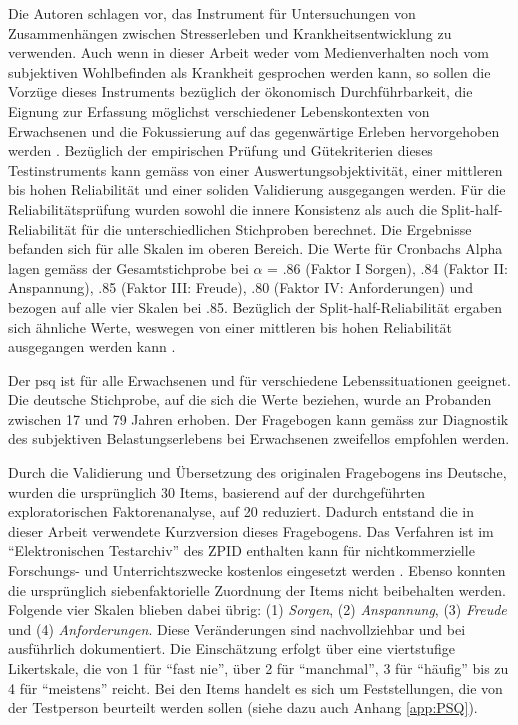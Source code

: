 Die Autoren  schlagen vor, das Instrument für Untersuchungen von Zusammenhängen zwischen Stresserleben und Krankheitsentwicklung zu verwenden. Auch wenn in dieser Arbeit weder vom Medienverhalten noch vom subjektiven Wohlbefinden als Krankheit gesprochen werden kann, so sollen die Vorzüge dieses Instruments bezüglich der ökonomisch Durchführbarkeit, die Eignung zur Erfassung möglichst verschiedener Lebenskontexten von Erwachsenen und die Fokussierung auf das gegenwärtige Erleben hervorgehoben werden \cite{Fliege2001}. Bezüglich der empirischen Prüfung und Gütekriterien dieses Testinstruments kann gemäss  von einer Auswertungsobjektivität, einer mittleren bis hohen Reliabilität und einer soliden Validierung ausgegangen werden. 
Für die Reliabilitätsprüfung wurden sowohl die innere Konsistenz als auch die Split-half-Reliabilität für die unterschiedlichen Stichproben berechnet. Die Ergebnisse befanden sich für alle Skalen im oberen Bereich. Die Werte für Cronbachs Alpha lagen gemäss \cite{Fliege2001} der Gesamtstichprobe bei $\alpha$ = .86 (Faktor I Sorgen), .84 (Faktor II: Anspannung), .85 (Faktor III: Freude), .80 (Faktor IV: Anforderungen) und bezogen auf alle vier Skalen bei .85. Bezüglich der Split-half-Reliabilität ergaben sich ähnliche Werte, weswegen von einer mittleren bis hohen Reliabilität ausgegangen werden kann \cite{Fliege2001}.

Der \acrshort{psq} \cite{Fliege2001} ist für alle Erwachsenen und für verschiedene Lebenssituationen geeignet. Die deutsche Stichprobe, auf die sich die Werte beziehen, wurde an Probanden zwischen 17 und 79 Jahren erhoben. Der Fragebogen kann gemäss  zur Diagnostik des subjektiven Belastungserlebens bei Erwachsenen zweifellos empfohlen werden.

Durch die Validierung und Übersetzung des originalen Fragebogens ins Deutsche, wurden die ursprünglich 30 Items, basierend auf der durchgeführten exploratorischen Faktorenanalyse, auf 20 reduziert. Dadurch entstand die in dieser Arbeit verwendete Kurzversion dieses Fragebogens. Das Verfahren ist im \enquote{Elektronischen Testarchiv} des ZPID enthalten kann für nichtkommerzielle Forschungs- und Unterrichtszwecke kostenlos eingesetzt werden \cite{ZPID}. Ebenso konnten die ursprünglich siebenfaktorielle Zuordnung der Items nicht beibehalten werden. Folgende vier Skalen blieben dabei übrig: (1) \textit{Sorgen}, (2) \textit{Anspannung}, (3) \textit{Freude} und (4) \textit{Anforderungen}. Diese Veränderungen sind nachvollziehbar und bei  ausführlich dokumentiert. Die Einschätzung erfolgt über eine viertstufige Likertskale, die von 1 für \enquote{fast nie}, über 2 für \enquote{manchmal}, 3 für \enquote{häufig} bis zu 4 für \enquote{meistens} reicht. Bei den Items handelt es sich um Feststellungen, die von der Testperson beurteilt werden sollen (siehe dazu auch Anhang \ref{app:PSQ}). 

